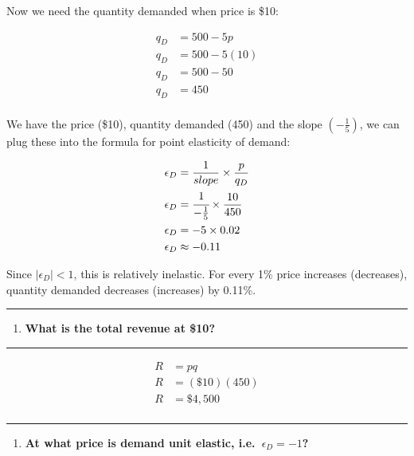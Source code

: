 \documentclass[
  11pt,
]{article}
\providecommand{\tightlist}{%
  \setlength{\itemsep}{0pt}\setlength{\parskip}{0pt}}
\begin{document}
Now we need the quantity demanded when price is \$10:

\[\begin{aligned}
    q_D&=500-5p\\
    q_D&=500-5(10)\\
    q_D&=500-50\\
    q_D&=450    \\
    \end{aligned}\]

We have the price (\$10), quantity demanded (450) and the slope
\((-\frac{1}{5})\), we can plug these into the formula for point
elasticity of demand:

\[\begin{aligned}
    \epsilon_D &= \frac{1}{slope} \times \frac{p}{q_D}\\    
    \epsilon_D &= \cfrac{1}{-\frac{1}{5}} \times \frac{10}{450} \\
    \epsilon_D &= -5 \times 0.02\\
    \epsilon_D &\approx -0.11   \\
    \end{aligned}\]

Since \(|\epsilon_D| < 1\), this is relatively inelastic. For every 1\%
price increases (decreases), quantity demanded decreases (increases) by
0.11\%.

\begin{center}\rule{0.5\linewidth}{0.5pt}\end{center}

\begin{enumerate}
\def\labelenumi{\alph{enumi}.}
\setcounter{enumi}{4}
\tightlist
\item
  \textbf{What is the total revenue at \$10?}
\end{enumerate}

\begin{center}\rule{0.5\linewidth}{0.5pt}\end{center}

\[\begin{aligned}
    R&=pq   \\
    R&=(\$10)(450)\\
    R&=\$4,500  \\
    \end{aligned}\]

\begin{center}\rule{0.5\linewidth}{0.5pt}\end{center}

\begin{enumerate}
\def\labelenumi{\alph{enumi}.}
\setcounter{enumi}{5}
\tightlist
\item
  \textbf{At what price is demand unit elastic, i.e.~\(\epsilon_D=-1\)?}
\end{enumerate}
\end{document}
